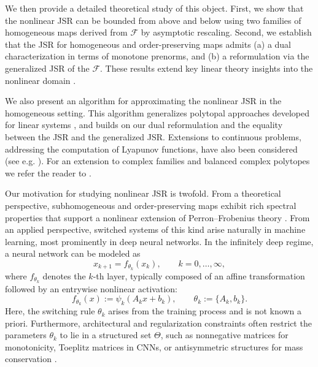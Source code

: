 \documentclass{article}
\newcommand{\family}{\mathcal{F}}
\begin{document}
%
We then provide a detailed theoretical study of this object. First, we show that the nonlinear JSR can be bounded from above and below using two families of homogeneous maps derived from $\family$ by asymptotic rescaling. Second, we establish that the JSR for homogeneous and order-preserving maps admits (a) a dual characterization in terms of monotone prenorms, and (b) a reformulation via the generalized JSR of the $\family$. These results extend key linear theory insights into the nonlinear domain \cite{jungers2009joint, rota1960note, BERGER199221, elsner1995generalized}.

We also present an algorithm for approximating the nonlinear JSR in the homogeneous setting. This algorithm generalizes polytopal approaches developed for linear systems \cite{guglielmi2001asymptotic, guglielmi2005complex, guglielmi2013exact, guglielmi2016balanced}, and builds on our dual reformulation and the equality between the JSR and the generalized JSR. Extensions to continuous problems, addressing the computation of Lyapunov functions, have also been considered (see e.g. \cite{guglielmi2017Lyapunov}).
For an extension to complex families and balanced complex polytopes we
refer the reader to \cite{guglielmi2007bcp}.

Our motivation for studying nonlinear JSR is twofold. From a theoretical perspective, subhomogeneous and order-preserving maps exhibit rich spectral properties that support a nonlinear extension of Perron–Frobenius theory \cite{lemmens2012nonlinear}. From an applied perspective, switched systems of this kind arise naturally in machine learning, most prominently in deep neural networks. In the infinitely deep regime, a neural network can be modeled as
%
\begin{equation}
    x_{k+1}=f_{\theta_k}(x_k), \qquad k=0,\dots,\infty,
\end{equation}
%
where $f_{\theta_k}$ denotes the $k$-th layer, typically composed of an affine transformation followed by an entrywise nonlinear activation:
%
\begin{equation}
   f_{\theta_k}(x):=\psi_k (A_kx+b_k), \qquad \theta_k:=\{A_k,b_k\}.
\end{equation}
%
Here, the switching rule $\theta_k$ arises from the training process and is not known a priori. Furthermore, architectural and regularization constraints often restrict the parameters $\theta_k$ to lie in a structured set $\Theta$, such as nonnegative matrices for monotonicity, Toeplitz matrices in CNNs, or antisymmetric structures for mass conservation \cite{lim70equivariant, savostianova2023robust, haber2017stable, celledoni2023dynamical, guglielmi2024contractivity}.
\end{document}
